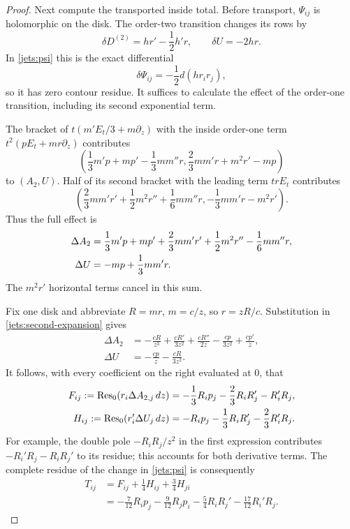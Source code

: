 \begin{proof}
Next compute the transported inside total.  Before transport,
$\Psi_{ij}$ is holomorphic on the disk.  The order-two transition
changes its rows by
\[
 \delta D^{(2)}=hr'-\frac12h'r,\qquad \delta U=-2hr.
\]
In \eqref{jets:psi} this is the exact differential
\begin{equation}\label{jets:psi-exact}
 \delta\Psi_{ij}=-\frac12d(hr_ir_j),
\end{equation}
so it has zero contour residue.
It suffices to calculate the effect of the order-one transition,
including its second exponential term.

The bracket of $t(m'E_t/3+m\partial_z)$ with the inside order-one
term $t^2(pE_t+mr\partial_z)$ contributes
\[
 \left(\frac13m'p+mp'-\frac13mm''r,
              \frac23mm'r+m^2r'-mp\right)
\]
to $(A_2,U)$.  Half of its second bracket with the leading term
$trE_t$ contributes
\[
 \left(\frac23mm'r'+\frac12m^2r''+\frac16mm''r,
              -\frac13mm'r-m^2r'\right).
\]
Thus the full effect is
\begin{align}
 \Delta A_2&=\frac13m'p+mp'+\frac23mm'r'
                         +\frac12m^2r''-\frac16mm''r,
 \notag\\
 \Delta U&=-mp+\frac13mm'r.
 \label{jets:second-expansion}
\end{align}
The $m^2r'$ horizontal terms cancel in this sum.

Fix one disk and abbreviate $R=mr$, $m=c/z$, so $r=zR/c$.
Substitution in \eqref{jets:second-expansion} gives
\[
 \begin{aligned}
 \Delta A_2&=-\frac{cR}{z^3}+\frac{cR'}{3z^2}
             +\frac{cR''}{2z}-\frac{cp}{3z^2}+\frac{cp'}z,
 \\
 \Delta U&=-\frac{cp}z-\frac{cR}{3z^2}.
 \end{aligned}
\]
It follows, with every coefficient on the right evaluated at $0$, that
\begin{align}
 F_{ij}:=\operatorname{Res}_0(r_i\Delta A_{2,j}\,dz)
   &=-\frac13R_ip_j-\frac23R_iR_j'-R_i'R_j,\notag\\
 H_{ij}:=\operatorname{Res}_0(r_i'\Delta U_j\,dz)
   &=-R_ip_j-\frac13R_iR_j'-\frac23R_i'R_j.
 \label{jets:laurent-residues}
\end{align}
For example, the double pole $-R_iR_j/z^2$ in the first expression
contributes $-R_i'R_j-R_iR_j'$ to its residue; this accounts for both
derivative terms.  The complete residue of the change in
\eqref{jets:psi} is consequently
\begin{equation}\label{jets:full-residue-matrix}
 \begin{aligned}
 T_{ij}&=F_{ij}+\frac14H_{ij}+\frac34H_{ji}\\
 &=-\frac7{12}R_ip_j-\frac9{12}R_jp_i
                -\frac54R_iR_j'-\frac{17}{12}R_i'R_j.
 \end{aligned}
\end{equation}


\end{proof}
